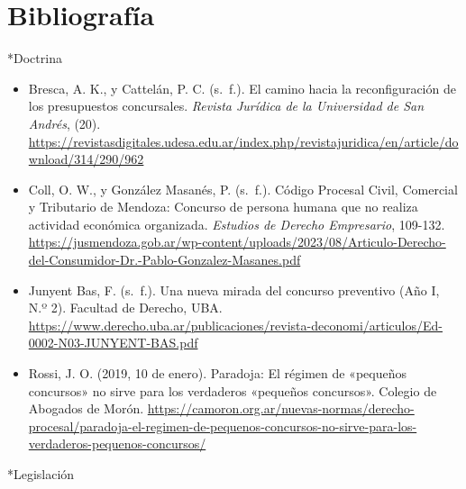 \documentclass[12pt,oneside]{book}
\makeatletter
\renewcommand\section{\@startsection{section}{1}{\z@}{-3.5ex \@plus -1ex \@minus -.2ex}{2.3ex \@plus.2ex}{\normalfont\Large\bfseries\raggedright}}
\makeatother
\begin{document}
\backmatter

\chapter*{Bibliografía}

\section*{Doctrina}

\begin{itemize}[leftmargin=*]
  \item Bresca, A. K., y Cattelán, P. C. (s.~f.). El camino hacia la reconfiguración de los presupuestos concursales. \textit{Revista Jurídica de la Universidad de San Andrés}, (20). \url{https://revistasdigitales.udesa.edu.ar/index.php/revistajuridica/en/article/download/314/290/962}
  \item Coll, O. W., y González Masanés, P. (s.~f.). Código Procesal Civil, Comercial y Tributario de Mendoza: Concurso de persona humana que no realiza actividad económica organizada. \textit{Estudios de Derecho Empresario}, 109-132. \url{https://jusmendoza.gob.ar/wp-content/uploads/2023/08/Articulo-Derecho-del-Consumidor-Dr.-Pablo-Gonzalez-Masanes.pdf}
  \item Junyent Bas, F. (s.~f.). Una nueva mirada del concurso preventivo (Año I, N.º 2). Facultad de Derecho, UBA. \url{https://www.derecho.uba.ar/publicaciones/revista-deconomi/articulos/Ed-0002-N03-JUNYENT-BAS.pdf}
  \item Rossi, J. O. (2019, 10 de enero). Paradoja: El régimen de «pequeños concursos» no sirve para los verdaderos «pequeños concursos». Colegio de Abogados de Morón. \url{https://camoron.org.ar/nuevas-normas/derecho-procesal/paradoja-el-regimen-de-pequenos-concursos-no-sirve-para-los-verdaderos-pequenos-concursos/}
\end{itemize}

\section*{Legislación}
\end{document}
